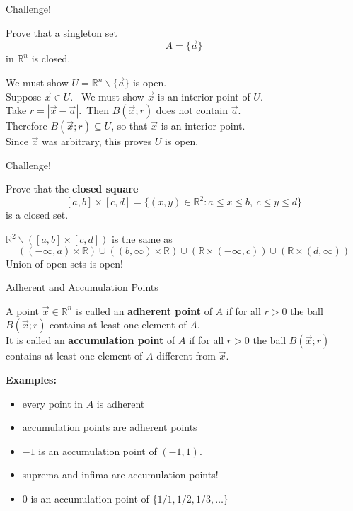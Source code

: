 \documentclass{beamer}
\begin{document}
\begin{frame}{Challenge!}
\begin{prob}
Prove that a singleton set
$$A = \{\vec a\}$$
in $\mathbb{R}^n$ is closed.
\end{prob}
\pause
\begin{soln}
We must show $U = \mathbb{R}^n\backslash\{\vec a\}$ is open.\\\pause
Suppose $\vec x\in U$.\ \pause
We must show $\vec x$ is an interior point of $U$.\\\pause
Take $r = |\vec x-\vec a|$.\ \pause Then $B(\vec x; r)$ does not contain $\vec a$.\\\pause
Therefore $B(\vec x; r)\subseteq U$, so that $\vec x$ is an interior point.\\\pause
Since $\vec x$ was arbitrary, this proves $U$ is open.
\end{soln}
\end{frame}

\begin{frame}{Challenge!}
\begin{prob}
Prove that the \textbf{closed square}
$$[a,b]\times [c,d] = \{(x,y)\in\mathbb{R}^2: a \leq x \leq b,\ c\leq y\leq d\}$$
is a closed set.
\end{prob}
\pause
\begin{soln}
$\mathbb{R}^2\backslash ([a,b]\times [c,d])$ is the same as
$$((-\infty,a)\times \mathbb{R})\cup ((b,\infty)\times \mathbb{R})\cup(\mathbb{R}\times (-\infty,c))\cup (\mathbb{R}\times (d,\infty))$$
\pause
Union of open sets is open!
\end{soln}
\end{frame}



\begin{frame}{Adherent and Accumulation Points}
\begin{defn}
A point $\vec x\in \mathbb{R}^n$ is called an \textbf{adherent point} of $A$ if for all $r > 0$ the ball $B(\vec x; r)$ contains at least one element of $A$.\\
\pause
It is called an \textbf{accumulation point} of $A$ if for all $r > 0$ the ball $B(\vec x; r)$ contains at least one element of $A$ {\color{red} different from $\vec x$}.
\end{defn}
\pause
\textbf{Examples:}
\begin{itemize}
\pause
\item every point in $A$ is adherent
\pause
\item accumulation points are adherent points
\pause
\item $-1$ is an accumulation point of $(-1,1)$.
\pause
\item suprema and infima are accumulation points!
\pause
\item $0$ is an accumulation point of $\{1/1,1/2,1/3,\dots\}$
\end{itemize}
\end{frame}
\end{document}
